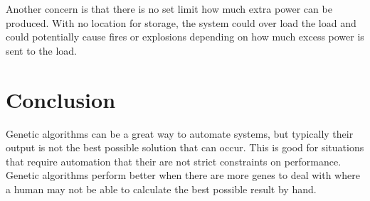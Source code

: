 \documentclass[conference]{IEEEtran}
\begin{document}
    Another concern is that there is no set limit how much extra power can be produced.  With no location for storage, the system could over load the load and could potentially cause fires or explosions depending on how much excess power is sent to the load.

    \section{Conclusion}
    Genetic algorithms can be a great way to automate systems, but typically their output is not the best possible solution that can occur.  This is good for situations that require automation that their are not strict constraints on performance.  Genetic algorithms perform better when there are more genes to deal with where a human may not be able to calculate the best possible result by hand.  
\end{document}
